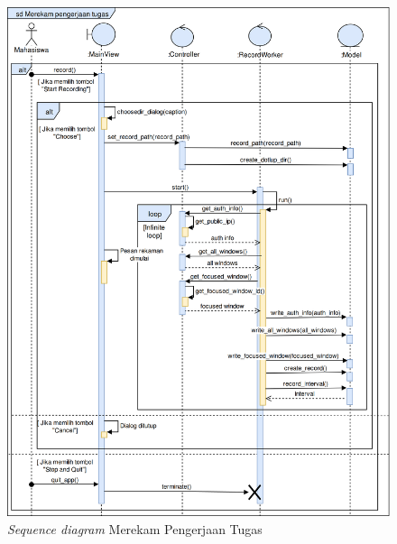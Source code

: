 \begin{figure}[tph]
  \centering
  \includegraphics[width=.9\linewidth]{img/use-case/sd/sd-record-v2_4}
  \caption{\emph{Sequence diagram} Merekam Pengerjaan Tugas}\label{fig:sd-record}
\end{figure}

